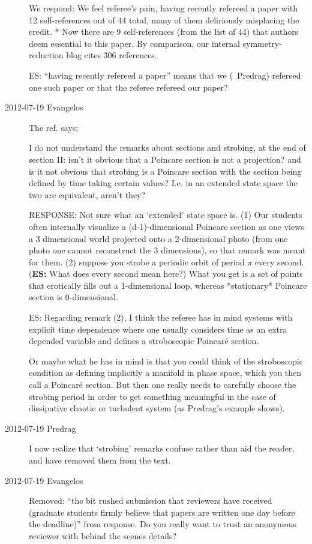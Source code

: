 \begin{description}
We respond:
We feel referee's pain, having recently refereed a paper with 12
self-references out of 44 total, many of them deliriously misplacing the
credit.
*   Now there are 9 self-references (from the list of 44) that authors
    deem essential to this paper. By comparison, our internal
    symmetry-reduction blog cites 306 references.

ES: ``having recently refereed a paper'' means that we (\ie\ Predrag)
refereed one such paper or that the referee refereed our paper?

\item[2012-07-19 Evangelos] The ref. says:

I do not understand the remarks about sections and strobing, at the end
of section II: isn't it obvious that a Poincare section is not a
projection? and is it not obvious that strobing is a Poincare section
with the section being defined by time taking certain values? I.e. in an
extended state space the two are equivalent, aren't they?

RESPONSE: Not sure what an `extended' state space is.
(1) Our students often internally visualize a (d-1)-dimensional Poincare
section as one views a 3 dimensional world projected onto a 2-dimensional
photo (from one photo one cannot reconstruct the 3 dimensions), so that
remark was meant for them.
(2) suppose you strobe a periodic orbit of period $\pi$ every second.
({\bf ES:} What does every second mean here?)
What you get is a set of points that erotically fills out a
1-dimensional loop, whereas *stationary* Poincare section is
0-dimensional.

ES: Regarding remark (2), I think the referee has in mind systems with
explicit time dependence where one usually considers time as an extra
depended variable and defines a stroboscopic Poincar\'e section.

Or maybe what he has in mind is that you could think of the stroboscopic
condition as defining implicitly a manifold in phase space, which you
then call a Poincar\'e section. But then one really needs to carefully
choose the strobing period in order to get something meaningful in the
case of dissipative chaotic or turbulent system (as Predrag's example
shows).

\item[2012-07-19 Predrag]  I now realize that `strobing' remarks confuse
rather than aid the reader, and have removed them from the text.

\item[2012-07-19 Evangelos] Removed: ``the bit rushed submission that
reviewers have received (graduate students firmly believe that papers are
written one day before the deadline)'' from response. Do you really want
to trust an anonymous reviewer with behind the scenes details?

\end{description}



